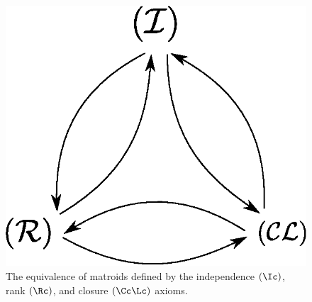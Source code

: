 \begin{figure}[h]
    \centering
    \includegraphics[scale=0.5]{Figures/Chapter1/equiv_def_2.eps}
    \caption{The equivalence of matroids defined by the independence $(\Ic)$,
    rank $(\Rc)$, and closure $(\Cc\Lc)$ axioms.}
    \label{fig_1.8}
\end{figure}
